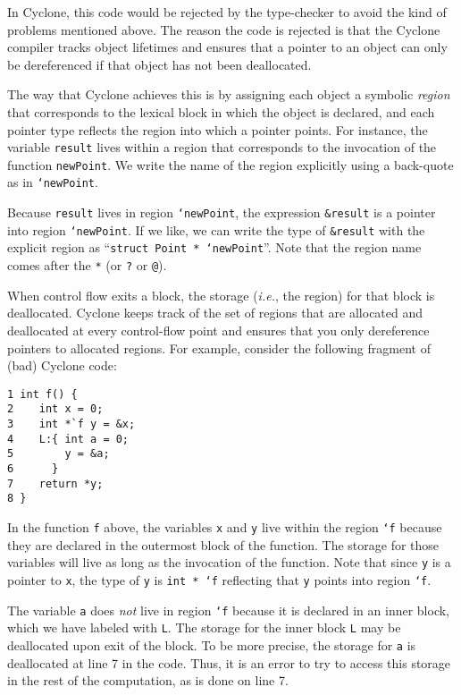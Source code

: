 In Cyclone, this code would be rejected by the type-checker to avoid
the kind of problems mentioned above.  The reason the code is rejected
is that the Cyclone compiler tracks object lifetimes and ensures that
a pointer to an object can only be dereferenced if that object 
has not been deallocated.  

The way that Cyclone achieves this is by assigning each object a
symbolic \emph{region} that corresponds to the lexical block in which
the object is declared, and each pointer type reflects the region
into which a pointer points.  For instance, the variable \texttt{result}
lives within a region that corresponds to the
invocation of the function \texttt{newPoint}.  We write the
name of the region explicitly using a back-quote as in \texttt{`newPoint}.

Because \texttt{result} lives in region \texttt{`newPoint}, the
expression \texttt{\&result} is a pointer into region
\texttt{`newPoint}.  If we like, we can write the type of
\texttt{\&result} with the explicit region as ``\texttt{struct Point *
`newPoint}''.  Note that the region name comes after the \texttt{*} (or
\texttt{?} or \texttt{@}).  

When control flow exits a block, the storage (\emph{i.e.}, 
the region) for that 
block is deallocated.  Cyclone keeps track of the set of regions that
are allocated and deallocated at every control-flow point and ensures
that you only dereference pointers to allocated regions.  For example,
consider the following fragment of (bad) Cyclone code:
\begin{verbatim}
1 int f() {
2    int x = 0;
3    int *`f y = &x;
4    L:{ int a = 0;
5        y = &a;
6      }
7    return *y;
8 }
\end{verbatim}
In the function \texttt{f} above, the variables \texttt{x} and 
\texttt{y} live within the region \texttt{`f} because they are
declared in the outermost block of the function.  The storage for
those variables will live as long as the invocation of the function.
Note that since \texttt{y} is a pointer to \texttt{x}, the type of
\texttt{y} is \texttt{int * `f} reflecting that \texttt{y} points into
region \texttt{`f}.

The variable \texttt{a} does \emph{not} live in region \texttt{`f} because
it is declared in an inner block, which we have labeled with
\texttt{L}.  The storage for the inner block \texttt{L} may be
deallocated upon exit of the block.  To be more precise, the
storage for \texttt{a} is deallocated
at line 7 in the code.  Thus, it is an error to try to access
this storage in the rest of the computation, as is done on line 7.

